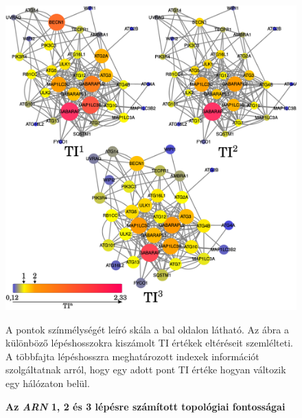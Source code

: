 \documentclass[a4paper,12pt]{article}
\newenvironment{imgdesc}{
		\small
		\singlespacing
		\begin{center}

	}{
		\end{center}
	}
\begin{document}
				\begin{figure}[H]
					\includegraphics[scale=0.48]{img/arn_123_comp.pdf}
					\centering
					\caption{ \textbf{Az \textit{ARN} 1, 2 és 3 lépésre számított topológiai fontosságai}}
					\begin{imgdesc}
						A pontok színmélységét leíró skála a bal oldalon látható. Az ábra a különböző lépéshosszokra kiszámolt TI értékek eltéréseit szemlélteti. A többfajta lépéshosszra meghatározott indexek információt szolgáltatnak arról, hogy egy adott pont TI értéke hogyan változik egy hálózaton belül.
					\end{imgdesc}

					\label{fig:arn123}
				\end{figure}
\end{document}
